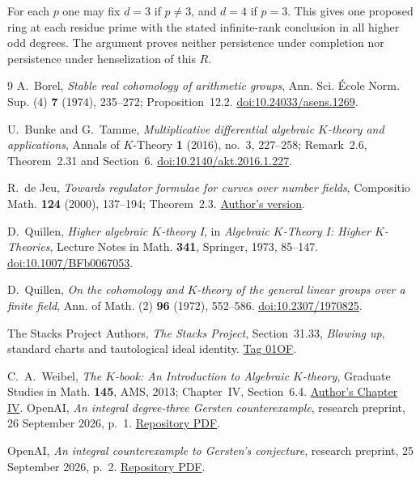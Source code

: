 \documentclass[11pt,a4paper]{article}
\theoremstyle{remark}
\begin{document}
For each $p$ one may fix $d=3$ if $p\ne3$, and $d=4$
if $p=3$. This gives one proposed ring at each residue prime
with the stated infinite-rank conclusion in all higher odd
degrees. The argument proves neither persistence under
completion nor persistence under henselization of this $R$.

\clearpage
{\small
\begin{thebibliography}{9}
A.~Borel, \emph{Stable real cohomology of arithmetic groups},
Ann. Sci. \'Ecole Norm. Sup. (4) \textbf{7} (1974), 235--272;
Proposition~12.2.
\href{https://doi.org/10.24033/asens.1269}{doi:10.24033/asens.1269}.

U.~Bunke and G.~Tamme, \emph{Multiplicative differential algebraic
\(K\)-theory and applications}, Annals of \(K\)-Theory
\textbf{1} (2016), no.~3, 227--258;
Remark~2.6, Theorem~2.31 and Section~6.
\href{https://doi.org/10.2140/akt.2016.1.227}{doi:10.2140/akt.2016.1.227}.

R.~de Jeu, \emph{Towards regulator formulae for curves over number
fields}, Compositio Math. \textbf{124} (2000), 137--194;
Theorem~2.3.
\href{https://arxiv.org/abs/math/9811192}{Author's version}.

D.~Quillen, \emph{Higher algebraic \(K\)-theory I}, in
\emph{Algebraic \(K\)-Theory I: Higher \(K\)-Theories},
Lecture Notes in Math. \textbf{341}, Springer, 1973, 85--147.
\href{https://doi.org/10.1007/BFb0067053}{doi:10.1007/BFb0067053}.

D.~Quillen, \emph{On the cohomology and \(K\)-theory of the general
linear groups over a finite field}, Ann. of Math. (2)
\textbf{96} (1972), 552--586.
\href{https://doi.org/10.2307/1970825}{doi:10.2307/1970825}.

The Stacks Project Authors, \emph{The Stacks Project},
Section~31.33, \emph{Blowing up}, standard charts and tautological
ideal identity.
\href{https://stacks.math.columbia.edu/tag/01OF}{Tag 01OF}.

C.~A.~Weibel, \emph{The \(K\)-book: An Introduction to Algebraic
\(K\)-theory}, Graduate Studies in Math. \textbf{145}, AMS, 2013;
Chapter~IV, Section~6.4.
\href{https://sites.math.rutgers.edu/~weibel/Kbook/Kbook.IV.pdf}{Author's Chapter IV}.
OpenAI, \emph{An integral degree-three Gersten counterexample},
research preprint, 26 September 2026, p.~1.
\href{https://github.com/openai/math/blob/main/preprints/An-Integral-Degree-Three-Gersten-Counterexample-September-26-2026/paper.pdf}{Repository PDF}.

OpenAI, \emph{An integral counterexample to Gersten's conjecture},
research preprint, 25 September 2026, p.~2.
\href{https://github.com/openai/math/blob/main/preprints/An-Integral-Counterexample-to-Gerstens-Conjecture-September-25-2026/An-Integral-Counterexample-to-Gerstens-Conjecture-September-25-2026.pdf}{Repository PDF}.

\end{thebibliography}}
\end{document}
